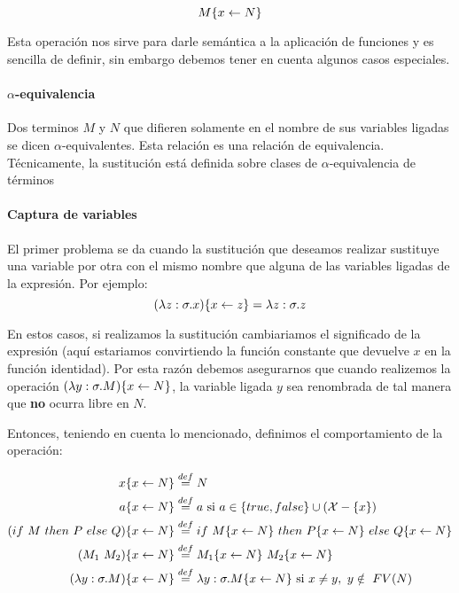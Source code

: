 $$M\{x\leftarrow N\}$$

Esta operación nos sirve para darle semántica a la aplicación de funciones y es sencilla de definir, sin embargo debemos tener en cuenta algunos casos especiales.

\paragraph{$\alpha$-equivalencia} Dos terminos $M$ y $N$ que difieren solamente en el nombre de sus variables ligadas se dicen $\alpha$-equivalentes. Esta relación es una relación de equivalencia. Técnicamente, la sustitución está definida sobre clases de $\alpha$-equivalencia de términos


\paragraph{Captura de variables}\label{calculo_lambda:captura_variables} El primer problema se da cuando la sustitución que deseamos realizar sustituye una variable por otra con el mismo nombre que alguna de las variables ligadas de la expresión. Por ejemplo:
$$(\lambda z: \sigma . x)\{x\leftarrow z\} = \lambda z: \sigma . z$$

En estos casos, si realizamos la sustitución cambiariamos el significado de la expresión (aquí estariamos convirtiendo la función constante que devuelve $x$ en la función identidad). Por esta razón debemos asegurarnos que cuando realizemos la operación $(\lambda y: \sigma . M)\{x\leftarrow N\}$, la variable ligada $y$ sea renombrada de tal manera que \textbf{no} ocurra libre en $N$.

\vspace*{5mm}
Entonces, teniendo en cuenta lo mencionado, definimos el comportamiento de la operación:

\begin{equation*}
	\begin{split}
		x\{x\leftarrow N\} &\overset{def}{=} N \\
		a\{x\leftarrow N\} &\overset{def}{=} a \text{ si } a \in \{true,false\}\cup(\mathcal{X}-\{x\}) \\
		(if~ M~ then~ P~ else~ Q)\{x\leftarrow N\} &\overset{def}{=} if~ M\{x\leftarrow N\}~ then~ P\{x\leftarrow N\}~ else~ Q\{x\leftarrow N\}\\
		(M_1~M_2)\{x\leftarrow N\} &\overset{def}{=} M_1\{x\leftarrow N\}~M_2\{x\leftarrow N\}\\
		(\lambda y: \sigma . M)\{x\leftarrow N\} &\overset{def}{=} \lambda y: \sigma . M\{x\leftarrow N\}~\text{si } x\neq y,~y\notin~FV(N)
	\end{split}
\end{equation*}


